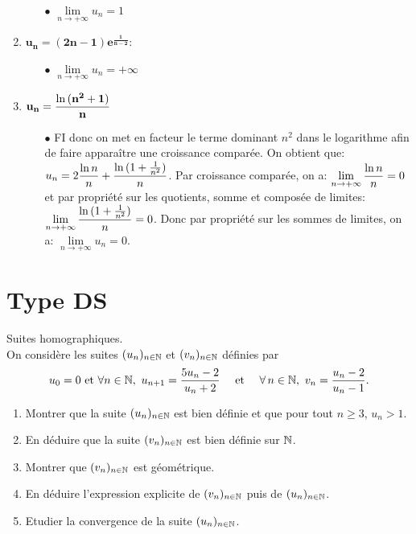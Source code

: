 \documentclass[a4paper, 11pt]{article}
\begin{document}
\begin{correction}
\begin{enumerate}
\begin{itemize}
\item[$\bullet$] $\lim\limits_{n\to +\infty} u_n=1$
\end{itemize} 
\item $\mathbf{u_n=(2n-1)e^{\frac{1}{n-2}}}$:
\begin{itemize}
\item[$\bullet$] $\lim\limits_{n\to +\infty} u_n=+\infty$
\end{itemize} 
\item$\mathbf{u_n=\displaystyle\frac{\ln{(n^2+1)}}{n}}$
\begin{itemize}

\item[$\bullet$]  FI donc on met en facteur le terme dominant $n^2$ dans le logarithme afin de faire appara\^{i}tre une croissance compar\'ee. On obtient que: $u_n=2\displaystyle\frac{\ln{n}}{n}+\displaystyle\frac{\ln{(1+\frac{1}{n^2})}}{n}$. Par croissance compar\'ee, on a: $\lim\limits_{n\to +\infty} \displaystyle\frac{\ln{n}}{n}=0$ et par propri\'et\'e sur les quotients, somme et compos\'ee de limites: $\lim\limits_{n\to +\infty} \displaystyle\frac{\ln{(1+\frac{1}{n^2})}}{n}=0$. Donc par propri\'et\'e sur les sommes de limites, on a: $\lim\limits_{n\to +\infty} u_n=0$. 
\end{itemize} 
\end{enumerate}
\end{correction}





\section*{Type DS}

\begin{exercice}  \; Suites homographiques.\\
\noindent On consid\`ere les suites $(u_n)_{n\in \mathbb{N}}$ et $(v_n)_{n\in \mathbb{N}}$ d\'efinies par
$$u_0=0\ \hbox{et}\ \forall n\in\N,\ u_{n+1}=\ddp\frac{5u_n-2}{u_n+2} \quad \textmd{ et } \quad \forall \, n \in \N, \ v_n = \ddp\frac{u_n-2}{u_n-1}.$$
\begin{enumerate}
 \item
Montrer que la suite $(u_n)_{n\in \mathbb{N}}$ est bien d\'efinie et que pour tout $n\geq 3$, $u_n>1$. 
\item 
En d\'eduire que la suite $(v_n)_{n\in \mathbb{N}}$  est bien d\'efinie sur $\mathbb{N}$.
\item 
Montrer que $(v_n)_{n\in \mathbb{N}}$ est g\'eom\'etrique.
\item 
En d\'eduire l'expression explicite de $(v_n)_{n\in \mathbb{N}}$ puis de $(u_n)_{n\in \mathbb{N}}$.
\item Etudier la convergence de la suite $(u_n)_{n\in \mathbb{N}}$.
\end{enumerate}
\end{exercice}
\end{document}

